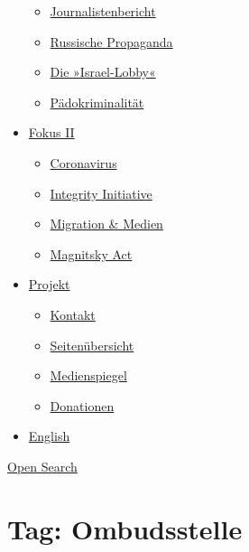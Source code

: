 \begin{itemize}
  \begin{itemize}
  \tightlist
  \item
    \href{https://swprs.org/bericht-eines-journalisten/}{Journalistenbericht}
  \item
    \href{https://swprs.org/russische-propaganda/}{Russische Propaganda}
  \item
    \href{https://swprs.org/die-israel-lobby-fakten-und-mythen/}{Die
    »Israel-Lobby«}
  \item
    \href{https://swprs.org/geopolitik-und-paedokriminalitaet/}{Pädokriminalität}
  \end{itemize}
\item
  \href{https://swprs.org/migration-und-medien/}{Fokus II}

  \begin{itemize}
  \tightlist
  \item
    \href{https://swprs.org/covid-19-hinweis-ii/}{Coronavirus}
  \item
    \href{https://swprs.org/die-integrity-initiative/}{Integrity
    Initiative}
  \item
    \href{https://swprs.org/migration-und-medien/}{Migration \& Medien}
  \item
    \href{https://swprs.org/der-fall-magnitsky/}{Magnitsky Act}
  \end{itemize}
\item
  \href{https://swprs.org/kontakt/}{Projekt}

  \begin{itemize}
  \tightlist
  \item
    \href{https://swprs.org/kontakt/}{Kontakt}
  \item
    \href{https://swprs.org/uebersicht/}{Seitenübersicht}
  \item
    \href{https://swprs.org/medienspiegel/}{Medienspiegel}
  \item
    \href{https://swprs.org/donationen/}{Donationen}
  \end{itemize}
\item
  \href{https://swprs.org/contact/}{English}
\end{itemize}

\protect\hyperlink{}{Open Search}

\hypertarget{tag-ombudsstelle}{%
\section{Tag: Ombudsstelle}\label{tag-ombudsstelle}}

